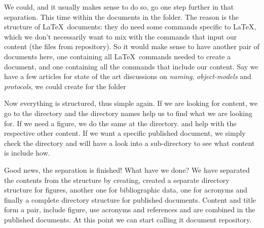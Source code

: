 We could, and it usually makes sense to do so, go one step further in that 
separation. This time within the documents in the  
folder. The reason is the structure of \LaTeX~documents: they do need some 
commands specific to \LaTeX, which we don't necessarily want to mix with the 
commands that input our content (the files from repository).
So it would make sense to have another pair of documents here, one 
containing all \LaTeX~commands needed to create a document, and one 
containing all the commands that include our content. Say we have a few 
articles for state of the art discussions on \textit{naming}, 
\textit{object-models} and \textit{protocols}, we could create
for the  folder%

Now everything is structured, thus simple again. If we are looking for content, we go to the 
 directory and the directory names help us to find what 
we are looking for. If we need a figure, we do the same at the  directory. 
 and  help with the respective 
other content. If we want a specific published document, we simply check the 
 directory and will have a look into a 
 sub-directory to see what content is include how.

Good news, the separation is finished! What have we done? We have 
separated the contents from the structure by creating, created a separate directory structure for 
figures, another one for bibliographic data, one for acronyms and finally a 
complete directory structure for published documents. Content and title 
form a pair, include figure, use acronyms and references and are combined 
in the published documents. At this point we can start calling it document repository.